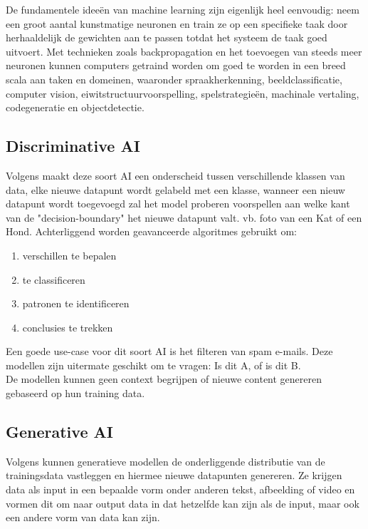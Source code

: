 De fundamentele ideeën van machine learning zijn eigenlijk heel eenvoudig: neem een groot aantal kunstmatige neuronen en train ze op een specifieke taak door herhaaldelijk de gewichten aan te passen totdat het systeem de taak goed uitvoert. Met technieken zoals backpropagation en het toevoegen van steeds meer neuronen kunnen computers getraind worden om goed te worden in een breed scala aan taken en domeinen, waaronder spraakherkenning, beeldclassificatie, computer vision, eiwitstructuurvoorspelling, spelstrategieën, machinale vertaling, codegeneratie en objectdetectie. \\

\subsection{Discriminative AI}
\label{ssec:discriminativeai}
Volgens \autocite{IBM2026} maakt deze soort AI een onderscheid tussen verschillende klassen van data, elke nieuwe datapunt wordt gelabeld met een klasse, wanneer een nieuw datapunt wordt toegevoegd zal het model proberen voorspellen aan welke kant van de "decision-boundary" het nieuwe datapunt valt. vb. foto van een Kat of een Hond. Achterliggend worden geavanceerde algoritmes gebruikt om:
\begin{enumerate}
    \item verschillen te bepalen
    \item te classificeren
    \item patronen te identificeren
    \item conclusies te trekken
\end{enumerate}

Een goede use-case voor dit soort AI is het filteren van spam e-mails. Deze modellen zijn uitermate geschikt om te vragen: Is dit A, of is dit B. \\

De modellen kunnen geen context begrijpen of nieuwe content genereren gebaseerd op hun training data.

\subsection{Generative AI}
\label{ssec:generativeai}

Volgens \autocite{IBM2026} kunnen generatieve modellen de onderliggende distributie van de trainingsdata vastleggen en hiermee nieuwe datapunten genereren. Ze krijgen data als input in een bepaalde vorm onder anderen tekst, afbeelding of video en vormen dit om naar output data in dat hetzelfde kan zijn als de input, maar ook een andere vorm van data kan zijn. \\

